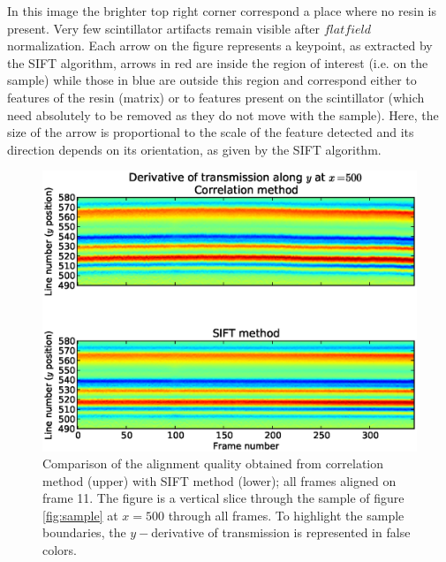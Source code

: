 \documentclass[preprint]{iucr}
\begin{document}
In this image the brighter top right corner correspond a place where no resin is
present. Very few scintillator artifacts remain visible after $flat
field$ normalization.
Each arrow on the figure represents a keypoint, as extracted by the SIFT
algorithm, arrows in red are inside the region of interest (i.e. on the sample)
while those in blue are outside this region and
correspond either to features of the resin (matrix) or to features present on
the scintillator (which need absolutely to be removed as they do not move
with the sample).
Here, the size of the arrow is proportional to the scale of the feature
detected and its direction depends on its orientation, as given by the SIFT algorithm.

\begin{figure}
\label{fig:alignment}
\begin{center}
\includegraphics[width=15cm]{alignment_h.eps}
\caption{Comparison of the alignment quality obtained from correlation method
(upper) with SIFT method (lower); all frames aligned on
frame 11. The figure is a vertical slice through the sample of figure
\ref{fig:sample} at $x=500$ through all frames. To highlight the sample
boundaries, the $y-$derivative of transmission is represented in false colors.}
\end{center}
\end{figure}
\end{document}
